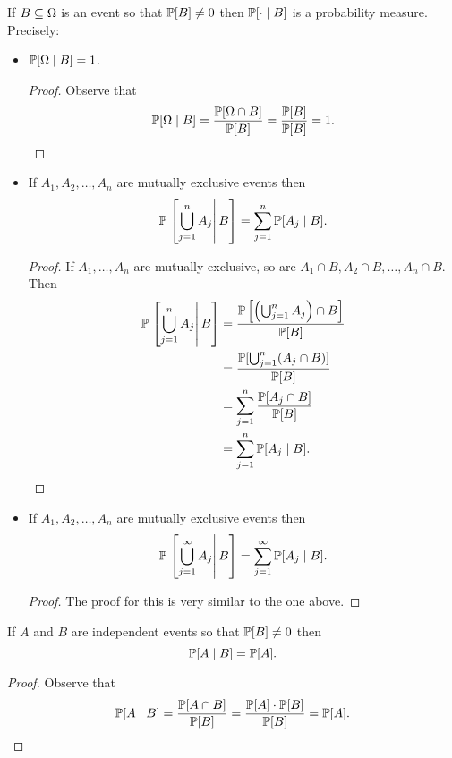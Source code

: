 \documentclass[class=article, crop=false]{standalone}
\begin{document}
  \begin{theorem}{}
    If $B\sse \Omega$ is an event so that $\P[B]\neq 0$ then $\P[\cdot \mid B]$ is a probability measure. Precisely:
    \begin{itemize}
      \item $\P[\Omega\mid B] = 1$.
      \begin{proof}
        Observe that
        \[
          \P[\Omega\mid B] = \frac{\P[\Omega\cap B]}{\P[B]} = \frac{\P[B]}{\P[B]} = 1.
        \]
      \end{proof}
      \item If $A_1,A_2,\dotsc,A_n$ are mutually exclusive events then
      \[
        \P\left.\left[\bigcup_{j = 1}^nA_j\right| B\right] = \sum_{j=1}^{n} \P[A_j\mid B].
      \]
      \begin{proof}
        If $A_1,\dotsc,A_n$ are mutually exclusive, so are $A_1\cap B, A_2\cap B, \dotsc, A_n\cap B$. Then
        \begin{align*}
          \P\left.\left[\bigcup_{j = 1}^nA_j\right| B\right] &= \frac{\P\left[\paren{\bigcup_{j = 1}^n A_j}\cap B\right]}{\P[B]} \\
                                                          &= \frac{\P[\bigcup_{j = 1}^n(A_j\cap B)]}{\P[B]} \\
                                                          &= \sum_{j=1}^{n} \frac{\P[A_j\cap B]}{\P[B]} \\
                                                          &= \sum_{j=1}^{n} \P[A_j\mid B].
        \end{align*}
      \end{proof}
      \item If $A_1,A_2,\dotsc,A_n$ are mutually exclusive events then
      \[
        \P\left.\left[\bigcup_{j = 1}^\infty A_j\right| B\right] = \sum_{j=1}^{\infty} \P[A_j\mid B].
      \]
      \begin{proof}
        The proof for this is very similar to the one above.
      \end{proof}
    \end{itemize}
  \end{theorem}
  \begin{theorem}{}
    If $A$ and $B$ are independent events so that $\P[B]\neq 0$ then
    \[
      \P[A\mid B] = \P[A].
    \]
    \begin{proof}
      Observe that
      \[
        \P[A\mid B] = \frac{\P[A\cap B]}{\P[B]} = \frac{\P[A]\cdot \P[B]}{\P[B]} = \P[A].
      \]
    \end{proof}
  \end{theorem}
\end{document}
